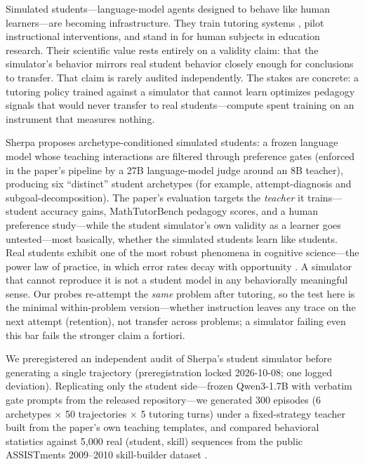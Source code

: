 \documentclass[notitlepage,12pt]{jedm}
\begin{document}
Simulated students---language-model agents designed to behave like human
learners---are becoming infrastructure. They train tutoring systems
\citep{xu2026sherpa}, pilot instructional interventions, and stand in for
human subjects in education research. Their scientific value rests entirely
on a validity claim: that the simulator's behavior mirrors real student
behavior closely enough for conclusions to transfer. That claim is rarely
audited independently. The stakes are concrete: a tutoring policy trained against
a simulator that cannot learn optimizes pedagogy signals that would never
transfer to real students---compute spent training on an instrument that
measures nothing.

Sherpa \citep{xu2026sherpa} proposes archetype-conditioned simulated
students: a frozen language model whose teaching interactions are filtered
through preference gates (enforced in the paper's pipeline by a 27B
language-model judge around an 8B teacher), producing six ``distinct'' student archetypes (for
example, attempt-diagnosis and subgoal-decomposition). The paper's evaluation
targets the \emph{teacher} it trains---student accuracy gains, MathTutorBench
pedagogy scores, and a human preference study---while the student simulator's
own validity as a learner goes untested---most basically, whether the
simulated students learn like students. Real students exhibit
one of the most robust phenomena in cognitive science---the power law of
practice, in which error rates decay with opportunity \citep{newell1981}. A
simulator that cannot reproduce it is not a student model in any behaviorally
meaningful sense. Our probes re-attempt the \emph{same} problem after
tutoring, so the test here is the minimal within-problem version---whether
instruction leaves any trace on the next attempt (retention), not transfer
across problems; a simulator failing even this bar fails the stronger claim
a fortiori.

We preregistered an independent audit of Sherpa's student simulator before
generating a single trajectory (preregistration locked 2026-10-08; one logged
deviation). Replicating only the student side---frozen Qwen3-1.7B with
verbatim gate prompts from the released repository---we generated 300
episodes (6 archetypes $\times$ 50 trajectories $\times$ 5 tutoring turns)
under a fixed-strategy teacher built from the paper's own teaching templates,
and compared behavioral statistics against 5{,}000 real (student, skill)
sequences from the public ASSISTments 2009--2010 skill-builder dataset
\citep{feng2009}.
\end{document}
